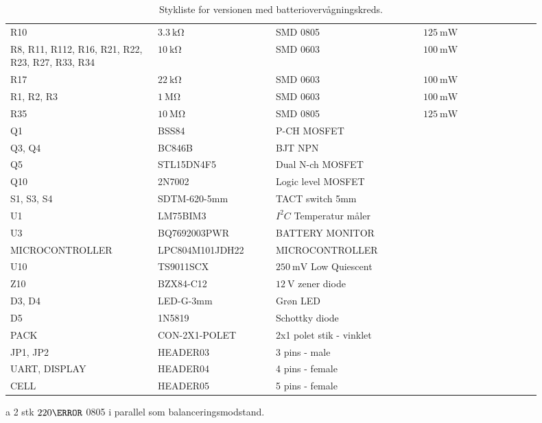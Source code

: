 \begin{table}[h!]
\begin{threeparttable}
\begin{tabular}{p{0.25\linewidth}p{0.2\linewidth}p{0.25\linewidth}p{0.15\linewidth}p{0.05\linewidth}}
			R10 & $\SI{3.3}{\kilo\ohm}$ & SMD 0805 & $\SI{125}{\milli\watt}$  \\
			R8, R11, R112, R16, R21, R22, R23, R27, R33, R34 & $\SI{10}{\kilo\ohm}$ & SMD 0603 & $\SI{100}{\milli\watt}$  \\
			R17 & $\SI{22}{\kilo\ohm}$ & SMD 0603 & $\SI{100}{\milli\watt}$  \\
			R1, R2, R3 & $\SI{1}{\mega\ohm}$ & SMD 0603 & $\SI{100}{\milli\watt}$  \\
			R35 & $\SI{10}{\mega\ohm}$ & SMD 0805 & $\SI{125}{\milli\watt}$  \\
			\midrule
			Q1     & BSS84 & P-CH MOSFET &   \\
			Q3, Q4 & BC846B & BJT NPN &   \\
			Q5     & STL15DN4F5 & Dual N-ch MOSFET &   \\
			Q10    & 2N7002 & Logic level MOSFET &   \\
			\midrule
			S1, S3, S4 & SDTM-620-5mm  & TACT switch 5mm &   \\
			U1 & LM75BIM3 & $I^{2}C$ Temperatur måler &   \\
			U3 & BQ7692003PWR & BATTERY MONITOR &   \\
			MICROCONTROLLER & LPC804M101JDH22 & MICROCONTROLLER & \\
			U10 & TS9011SCX & $\SI{250}{\milli\volt}$ Low Quiescent &   \\
			Z10 & BZX84-C12 & $\SI{12}{\volt}$ zener diode&   \\
			D3, D4 & LED-G-3mm  & Grøn LED &   \\
			D5 & 1N5819 & Schottky diode &   \\
			PACK & CON-2X1-POLET & 2x1 polet stik - vinklet &   \\
			JP1, JP2 & HEADER03 & 3 pins - male &   \\
			UART, DISPLAY & HEADER04 & 4 pins - female &   \\
			CELL & HEADER05 & 5 pins - female &   \\
			\hline
			\bottomrule
		\end{tabular}
		\begin{tablenotes}
			\item[a] 2 stk $220\ohm$ 0805 i parallel som balanceringsmodstand.
		\end{tablenotes}
	\end{threeparttable}
	\caption{Stykliste for versionen med batteriovervågningskreds.}
\end{table} 


